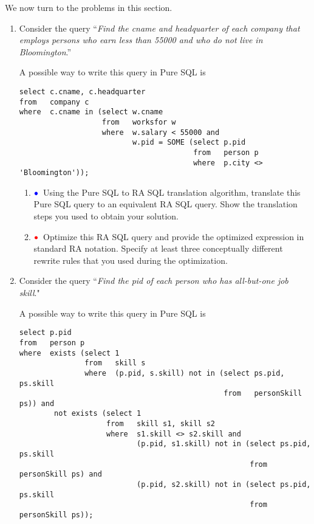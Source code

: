 \documentclass[11pt]{article}
\newcommand{\red}[1]{{\color{red}#1}}
\newcommand{\blue}[1]{{\color{blue}#1}}
\newcommand{\redbullet}{$\red{\bullet}$}
\newcommand{\bluebullet}{$\blue{\bullet}$}
\begin{document}
\newpage
We now turn to the problems in this section.

\begin{enumerate}[resume]
\item Consider the query ``\emph{Find the cname and headquarter of each company that employs persons who earn less than 55000 and
who do not live in Bloomington}.''

A possible way to write this query in Pure SQL is 
{\footnotesize
\begin{verbatim}
select c.cname, c.headquarter
from   company c
where  c.cname in (select w.cname
                   from   worksfor w
                   where  w.salary < 55000 and 
                          w.pid = SOME (select p.pid
                                        from   person p
                                        where  p.city <> 'Bloomington'));
\end{verbatim} }                  

\begin{enumerate}  
\item  \bluebullet\ Using the Pure SQL to RA SQL translation algorithm, translate this Pure SQL query to an
equivalent RA SQL query.   Show the translation steps you used to obtain your solution.
\item  \redbullet\ Optimize this RA SQL query and provide the optimized expression in standard RA notation.
Specify at least three conceptually different rewrite rules that you used during the optimization.
\end{enumerate}

\item Consider the query ``\emph{Find the pid of each person who has all-but-one job skill}."

A possible way to write this query in Pure SQL is
 {\footnotesize
\begin{verbatim}
select p.pid
from   person p
where  exists (select 1
               from   skill s
               where  (p.pid, s.skill) not in (select ps.pid, ps.skill 
                                               from   personSkill ps)) and
        not exists (select 1
                    from   skill s1, skill s2
                    where  s1.skill <> s2.skill and
                           (p.pid, s1.skill) not in (select ps.pid, ps.skill 
                                                     from   personSkill ps) and
                           (p.pid, s2.skill) not in (select ps.pid, ps.skill 
                                                     from   personSkill ps));
\end{verbatim} } 


\end{enumerate}
\end{document}
